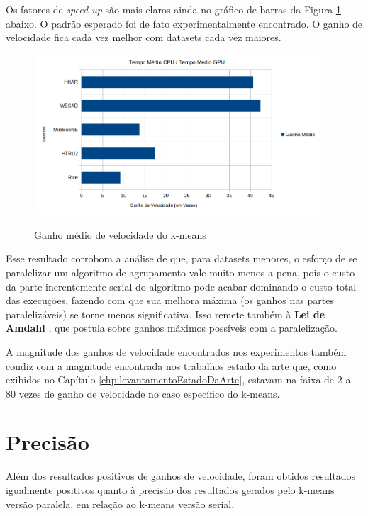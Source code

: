 \documentclass[12pt,
openright, 
oneside, %
a4paper,    %
brazil]{facom-ufu-abntex2}
\begin{document}
Os fatores de \textit{speed-up} são mais claros ainda no gráfico de barras da Figura \ref{fig:kMeansAvgSpeedup} abaixo. O padrão esperado foi de fato experimentalmente encontrado. O ganho de velocidade fica cada vez melhor com datasets cada vez maiores.

\begin{figure}[h]
  \caption{Ganho médio de velocidade do k-means}
  \centering
  \includegraphics[width=0.95\textwidth]{kMeansAvgSpeedup.png}
  \label{fig:kMeansAvgSpeedup}
\end{figure}

Esse resultado corrobora a análise de que, para datasets menores, o esforço de se paralelizar um algoritmo de agrupamento vale muito menos a pena, pois o custo da parte inerentemente serial do algoritmo pode acabar dominando o custo total das execuções, fazendo com que sua melhora máxima (os ganhos nas partes paralelizáveis) se torne menos significativa. Isso remete também à \textbf{Lei de Amdahl} \cite{Amdahl-Law}, que postula sobre ganhos máximos possíveis com a paralelização.

A magnitude dos ganhos de velocidade encontrados nos experimentos também condiz com a magnitude encontrada nos trabalhos estado da arte que, como exibidos no Capítulo \ref{chp:levantamentoEstadoDaArte}, estavam na faixa de 2 a 80 vezes de ganho de velocidade no caso específico do k-means.




\section{Precisão}
\label{sec:testesDePrecisao}

Além dos resultados positivos de ganhos de velocidade, foram obtidos resultados igualmente positivos quanto à precisão dos resultados gerados pelo k-means versão paralela, em relação ao k-means versão serial.
\end{document}
